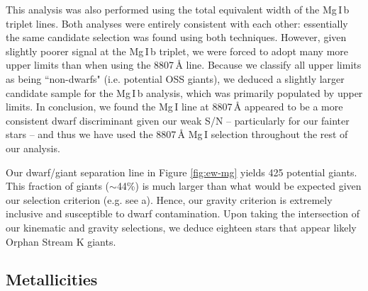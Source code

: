 \documentclass{emulateapj}
\begin{document}
This analysis was also performed using the total equivalent width of the Mg\,\textsc{I}\,b triplet lines. Both analyses were entirely consistent with each other: essentially the same candidate selection was found using both techniques. However, given slightly poorer signal at the Mg\,\textsc{I}\,b triplet, we were forced to adopt many more upper limits than when using the 8807\,{\AA} line. Because we classify all upper limits as being ``non-dwarfs" (i.e. potential OSS giants), we deduced a slightly larger candidate sample for the Mg\,\textsc{I}\,b analysis, which was primarily populated by upper limits. In conclusion, we found the Mg\,\textsc{I} line at 8807\,{\AA} appeared to be a more consistent dwarf discriminant given our weak S/N \--- particularly for our fainter stars \--- and thus we have used the 8807\,{\AA} Mg\,\textsc{I} selection throughout the rest of our analysis.

Our dwarf/giant separation line in Figure \ref{fig:ew-mg} yields 425 potential giants. This fraction of giants ($\sim$44\%) is much larger than what would be expected given our selection criterion (e.g. see \citeauthor{Casey;et-al_2012} \citeyear{Casey;et-al_2012}a). Hence, our gravity criterion is extremely inclusive and susceptible to dwarf contamination. Upon taking the intersection of our kinematic and gravity selections, we deduce eighteen stars that appear likely Orphan Stream K giants.


\subsection{Metallicities}
\label{sec:metallicities}
\end{document}
